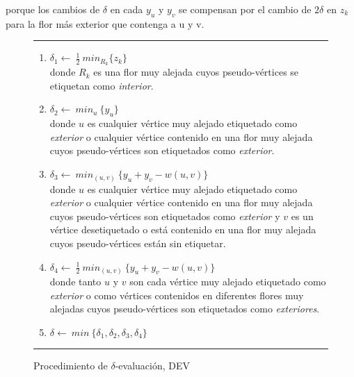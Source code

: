 \documentclass[10pt,a5paper]{book}
\begin{document}
porque los cambios de $\delta$ en cada $y_u$ y $y_v$ se compensan por el cambio de $2\delta$ en $z_k$ para la flor más exterior que contenga a u y v. \\
\vfill
\pagebreak
\begin{figure}[H]
\caption{Procedimiento de $\delta$-evaluación, DEV}
\hrule
\begin{enumerate}
\item $\delta_1 \leftarrow\ \frac{1}{2}\ min_{R_k} \{z_k\} $\\
  donde $R_k$ es una flor muy alejada cuyos pseudo-vértices se etiquetan como \emph{interior}.
\item $\delta_2 \leftarrow\ min_u\ \{y_u\} $\\
  donde $u$ es cualquier vértice muy alejado etiquetado como \emph{exterior} o cualquier vértice contenido en una flor muy alejada cuyos pseudo-vértices son etiquetados como \emph{exterior}.
\item $\delta_3 \leftarrow\ min_{(u,v)}\ \{y_u + y_v - w(u,v)\}$\\
  donde $u$ es cualquier vértice muy alejado etiquetado como \emph{exterior} o cualquier vértice contenido en una flor muy alejada cuyos pseudo-vértices son etiquetados como \emph{exterior} y $v$ es un vértice desetiquetado o está contenido en una flor muy alejada cuyos pseudo-vértices están sin etiquetar.
\item $\delta_4 \leftarrow\ \frac{1}{2}\ min_{(u,v)}\ \{y_u + y_v - w(u,v)\}$\\
  donde tanto $u$ y $v$ son cada vértice muy alejado etiquetado como \emph{exterior} o como vértices contenidos en diferentes flores muy alejadas cuyos pseudo-vértices son etiquetados como \emph{exteriores}.
\item $\delta \leftarrow\ min\ \{\delta_1, \delta_2, \delta_3, \delta_4\}$
\end{enumerate}
\hrule
\end{figure}
\end{document}
